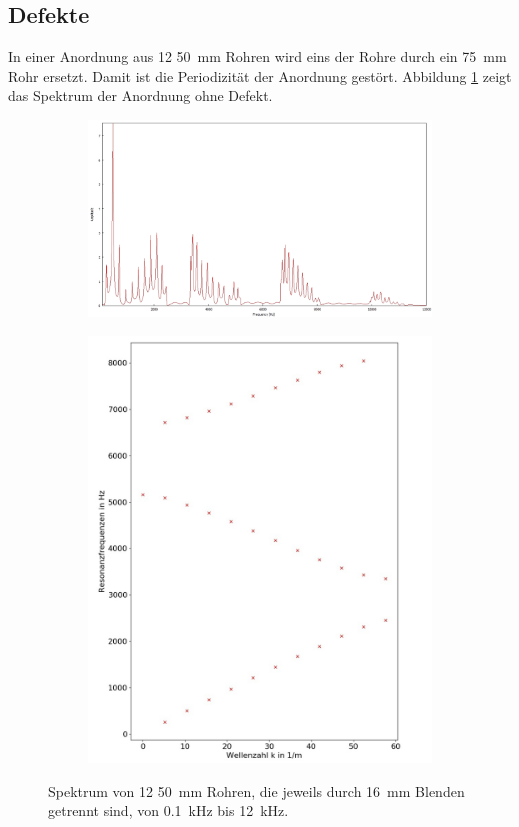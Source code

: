 \subsection{Defekte}
In einer Anordnung aus 12 50~mm Rohren wird eins der Rohre durch ein 75~mm Rohr ersetzt. 
Damit ist die Periodizität der Anordnung gestört.
Abbildung \ref{fig:4b_7} zeigt das Spektrum der Anordnung ohne Defekt.
\begin{figure}
\centering
\begin{subfigure}{0.65\textwidth}
\includegraphics[width=\textwidth]{content/messungen/Chapter4b/4b_7_12x50.jpg}
\end{subfigure}
\begin{subfigure}{0.34\textwidth}
\includegraphics[width=\textwidth]{content/Scripts/4b_7_red.jpg}
\end{subfigure}
\caption{Spektrum von 12 50~mm Rohren, die jeweils durch 16~mm Blenden getrennt sind, von 0.1~kHz bis 12~kHz.}
\label{fig:4b_7}
\end{figure}
